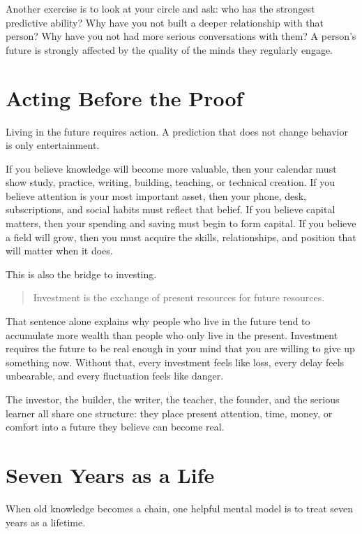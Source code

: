 Another exercise is to look at your circle and ask: who has the strongest predictive ability? Why have you not built a deeper relationship with that person? Why have you not had more serious conversations with them? A person's future is strongly affected by the quality of the minds they regularly engage.

\section*{Acting Before the Proof}

Living in the future requires action. A prediction that does not change behavior is only entertainment.

If you believe knowledge will become more valuable, then your calendar must show study, practice, writing, building, teaching, or technical creation. If you believe attention is your most important asset, then your phone, desk, subscriptions, and social habits must reflect that belief. If you believe capital matters, then your spending and saving must begin to form capital. If you believe a field will grow, then you must acquire the skills, relationships, and position that will matter when it does.

This is also the bridge to investing.

\begin{quote}
Investment is the exchange of present resources for future resources.
\end{quote}

That sentence alone explains why people who live in the future tend to accumulate more wealth than people who only live in the present. Investment requires the future to be real enough in your mind that you are willing to give up something now. Without that, every investment feels like loss, every delay feels unbearable, and every fluctuation feels like danger.

The investor, the builder, the writer, the teacher, the founder, and the serious learner all share one structure: they place present attention, time, money, or comfort into a future they believe can become real.

\section*{Seven Years as a Life}

When old knowledge becomes a chain, one helpful mental model is to treat seven years as a lifetime.


